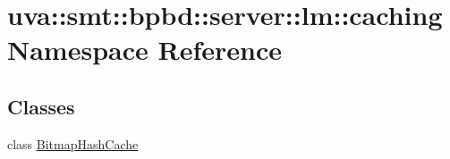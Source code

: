 \hypertarget{namespaceuva_1_1smt_1_1bpbd_1_1server_1_1lm_1_1caching}{}\section{uva\+:\+:smt\+:\+:bpbd\+:\+:server\+:\+:lm\+:\+:caching Namespace Reference}
\label{namespaceuva_1_1smt_1_1bpbd_1_1server_1_1lm_1_1caching}
\subsection*{Classes}
\begin{DoxyCompactItemize}
\item 
class \hyperlink{classuva_1_1smt_1_1bpbd_1_1server_1_1lm_1_1caching_1_1_bitmap_hash_cache}{Bitmap\+Hash\+Cache}
\end{DoxyCompactItemize}
